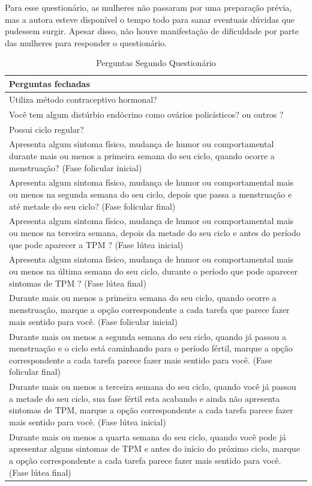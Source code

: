 Para esse questionário, as mulheres não passaram por uma preparação prévia, mas a autora esteve disponível o tempo 
todo para sanar eventuais dúvidas que pudessem surgir. Apesar disso, não houve manifestação de dificuldade por parte das mulheres 
para responder o questionário.

\begin{table}[htbp]
    \centering
    \caption{Perguntas Segundo Questionário}
    \label{tab10}
    \begin{tabular}{p{15cm}}
        \toprule
        \textbf{Perguntas fechadas} \\
        \midrule
         Utiliza método contraceptivo hormonal?   \\
        \midrule
         Você tem algum distúrbio endócrino como ovários policísticos? ou outros ? \\
        \midrule
         Possui ciclo regular?  \\
        \midrule
         Apresenta algum sintoma físico, mudança de humor ou comportamental durante mais ou menos a primeira semana do seu ciclo, quando ocorre a menstruação? (Fase folicular inicial)   \\
        \midrule
         Apresenta algum sintoma físico, mudança de humor ou comportamental mais ou menos na segunda semana do seu ciclo, depois que passa a menstruação e até metade do seu ciclo? (Fase folicular final)\\
        \midrule
         Apresenta algum sintoma físico, mudança de humor ou comportamental mais ou menos na terceira semana, depois da metade do seu ciclo e antes do período que pode aparecer a TPM ? (Fase lútea inicial) \\
        \midrule
         Apresenta algum sintoma físico, mudança de humor ou comportamental mais ou menos na última semana do seu ciclo, durante o período que pode aparecer sintomas de TPM ? (Fase lútea final)\\
        \midrule
         Durante mais ou menos a primeira semana do seu ciclo, quando ocorre a menstruação, marque a opção correspondente a cada tarefa que parece fazer mais sentido para você. (Fase folicular inicial) \\
        \midrule
         Durante mais ou menos a segunda semana do seu ciclo, quando já passou a menstruação e o ciclo está caminhando para o período fértil, marque a opção correspondente a cada tarefa parece fazer mais sentido para você. (Fase folicular final)\\
        \midrule
         Durante mais ou menos a terceira semana do seu ciclo, quando você já passou a metade do seu ciclo, sua fase fértil esta acabando e ainda não apresenta sintomas de TPM, marque a opção correspondente a cada tarefa parece fazer mais sentido para você. (Fase lútea inicial) \\
        \midrule
         Durante mais ou menos a quarta semana do seu ciclo, quando você pode já apresentar alguns sintomas de TPM e antes do início do próximo ciclo, marque a opção correspondente a cada tarefa parece fazer mais sentido para você. (Fase lútea final) \\
        \bottomrule
    \end{tabular}
\end{table}


